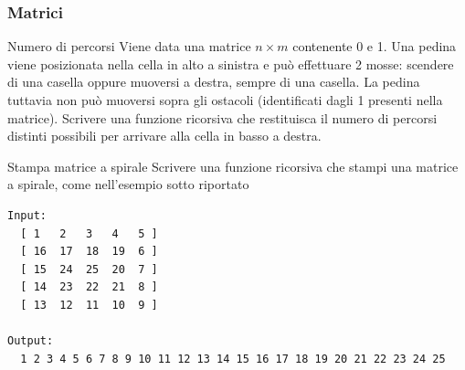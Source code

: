 \subsubsection{Matrici}
\begin{esercizio}{Numero di percorsi}
	Viene data una matrice $ n \times  m $ contenente 0 e 1. Una pedina viene posizionata nella cella in alto a sinistra e può effettuare 2 mosse: scendere di una casella oppure muoversi a destra, sempre di una casella. La pedina tuttavia non può muoversi sopra gli ostacoli (identificati dagli 1 presenti nella matrice). Scrivere una funzione ricorsiva che restituisca il numero di percorsi distinti possibili per arrivare alla cella in basso a destra.
\end{esercizio}
\begin{esercizio}{Stampa matrice a spirale}
	Scrivere una funzione ricorsiva che stampi una matrice a spirale, come nell'esempio sotto riportato
	\begin{lstlisting}[frame = none]
Input: 
  [ 1   2   3   4   5 ]
  [ 16  17  18  19  6 ]
  [ 15  24  25  20  7 ]
  [ 14  23  22  21  8 ]
  [ 13  12  11  10  9 ]   

Output:   
  1 2 3 4 5 6 7 8 9 10 11 12 13 14 15 16 17 18 19 20 21 22 23 24 25
\end{lstlisting}
\end{esercizio}


